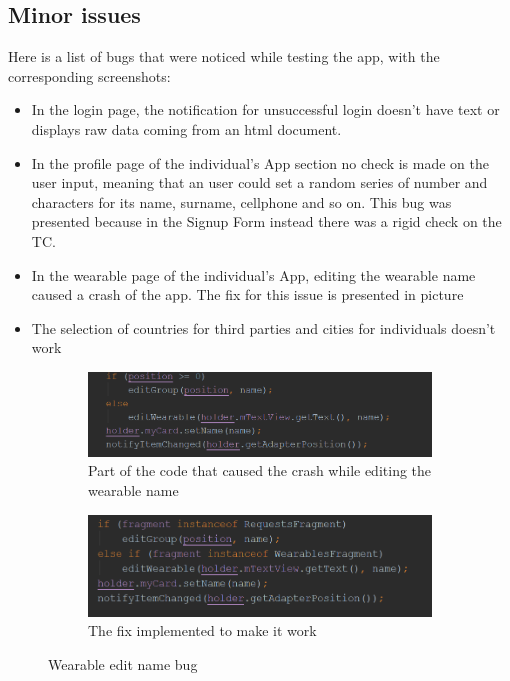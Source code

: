 \subsection{Minor issues}
Here is a list of bugs that were noticed while testing the app, with the corresponding screenshots:
\begin{itemize}
\item[] In the login page, the notification for unsuccessful login doesn't have text or displays raw data coming from an html document.
\item[] In the profile page of the individual's App section no check is made on the user input, meaning that an user could set a random series of number and characters for its name, surname, cellphone and so on. This bug was presented because in the Signup Form instead there was a rigid check on the TC.
\item[] In the wearable page of the individual's App, editing the wearable name caused a crash of the app. The fix for this issue is presented in picture
\item[] The selection of countries for third parties and cities for individuals doesn't work
\end{itemize}


\begin{figure}
\centering
\begin{subfigure}{.5\textwidth}
  \centering
   \includegraphics[scale=0.6]{resources/bugwearablwe.png}
   \caption{Part of the code that caused the crash while editing the wearable name}
  \label{fig:sub1}
\end{subfigure}%
\begin{subfigure}{.5\textwidth}
  \centering
   \includegraphics[scale=0.6]{resources/bugfixed.png}
   \caption{The fix implemented to make it work}
  \label{fig:sub2}
\end{subfigure}
\caption{Wearable edit name bug}
\label{fig:test}
\end{figure}

